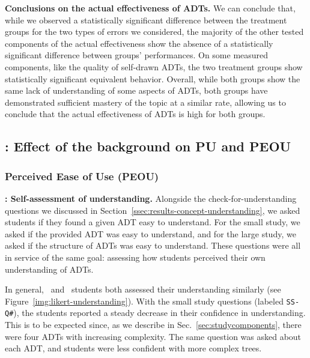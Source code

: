 \textbf{Conclusions on the actual effectiveness of ADTs.}
We can conclude that, while we observed a statistically significant difference between the treatment groups for the two types of errors we considered, the majority of the other tested components of the actual effectiveness show the absence of a statistically significant difference between groups' performances. On some measured components, like the quality of self-drawn ADTs, the two treatment groups show statistically significant equivalent behavior. Overall, while both groups show the same lack of understanding of some aspects of ADTs, both groups have demonstrated sufficient mastery of the topic at a similar rate, allowing us to conclude that the actual effectiveness of ADTs is high for both groups.









\subsection{: Effect of the background on \textbf{PU} and \textbf{PEOU}}\label{sec:rq2}


\subsubsection{Perceived Ease of Use (\textbf{PEOU})}


\textbf{\hypothesis{\hypoSelfUnderstand}: Self-assessment of understanding.}
Alongside the check-for-understanding questions we discussed in Section~\ref{ssec:results-concept-understanding}, we asked students if they found a given ADT easy to understand. For the small study, we asked if the provided ADT was easy to understand, and for the large study, we asked if the structure of ADTs was easy to understand. These questions were all in service of the same goal: assessing how students perceived their own understanding of ADTs.

In general, \ICS\ and \SEC\ students both assessed their understanding similarly (see Figure~\ref{img:likert-understanding}). With the small study questions (labeled \texttt{SS-Q\#}), the students reported a steady decrease in their confidence in understanding. This is to be expected since, as we describe in Sec.~\ref{sec:studycomponents}, there were four ADTs with increasing complexity. The same question was asked about each ADT, and students were less confident with more complex trees.

